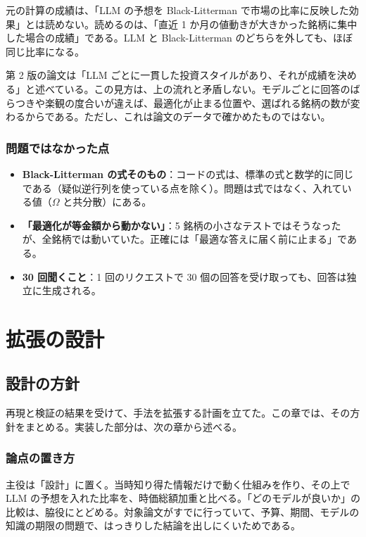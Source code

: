 \documentclass[xelatex,ja=standard,jafont=hiragino-pron,a4paper,10pt]{bxjsreport}
\begin{document}
元の計算の成績は、「LLM の予想を Black-Litterman で市場の比率に反映した効果」とは読めない。読めるのは、「直近 1 か月の値動きが大きかった銘柄に集中した場合の成績」である。LLM と Black-Litterman のどちらを外しても、ほぼ同じ比率になる。

第 2 版の論文は「LLM ごとに一貫した投資スタイルがあり、それが成績を決める」と述べている。この見方は、上の流れと矛盾しない。モデルごとに回答のばらつきや楽観の度合いが違えば、最適化が止まる位置や、選ばれる銘柄の数が変わるからである。ただし、これは論文のデータで確かめたものではない。

\section{問題ではなかった点}

\begin{itemize}
\item \textbf{Black-Litterman の式そのもの}：コードの式は、標準の式と数学的に同じである（疑似逆行列を使っている点を除く）。問題は式ではなく、入れている値（$\Omega$ と共分散）にある。
\item \textbf{「最適化が等金額から動かない」}：5 銘柄の小さなテストではそうなったが、全銘柄では動いていた。正確には「最適な答えに届く前に止まる」である。
\item \textbf{30 回聞くこと}：1 回のリクエストで 30 個の回答を受け取っても、回答は独立に生成される。
\end{itemize}

\part{拡張の設計}

\chapter{設計の方針}\label{ch:policy}

再現と検証の結果を受けて、手法を拡張する計画を立てた。この章では、その方針をまとめる。実装した部分は、次の章から述べる。

\section{論点の置き方}

主役は「設計」に置く。当時知り得た情報だけで動く仕組みを作り、その上で LLM の予想を入れた比率を、時価総額加重と比べる。「どのモデルが良いか」の比較は、脇役にとどめる。対象論文がすでに行っていて、予算、期間、モデルの知識の期限の問題で、はっきりした結論を出しにくいためである。
\end{document}
